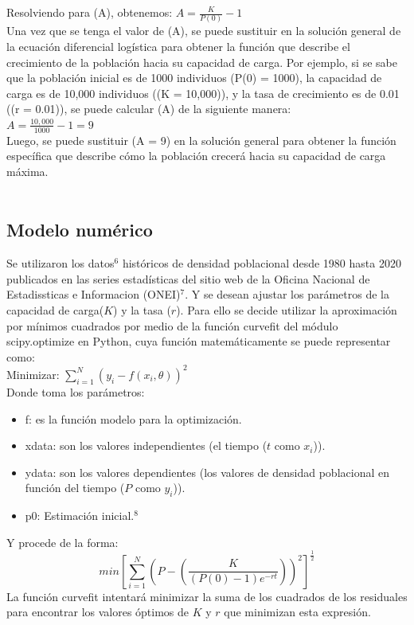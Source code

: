 \documentclass[a4paper,10pt,twocolumn]{article}
\begin{document}
Resolviendo para (A), obtenemos: $A = \frac{K}{P(0)} - 1$\\
Una vez que se tenga el valor de (A), se puede sustituir en la solución general de la ecuación diferencial 
logística para obtener la función que describe el crecimiento de la población hacia su capacidad de carga.
Por ejemplo, si se sabe que la población inicial es de 1000 individuos (P(0) = 1000), la capacidad de carga 
es de 10,000 individuos ((K = 10,000)), y la tasa de crecimiento es de 0.01 ((r = 0.01)), 
se puede calcular (A) de la siguiente manera:\\
$A = \frac{10,000}{1000} - 1 = 9$\\
Luego, se puede sustituir (A = 9) en la solución general para obtener la función específica que describe cómo la 
población crecerá hacia su capacidad de carga máxima.\\\\

	\subsection{Modelo numérico}\label{sub:num}
Se utilizaron los datos$^{6}$ históricos de densidad poblacional desde 1980 hasta 2020 publicados en las series estadísticas del sitio web de la Oficina Nacional de Estadissticas e Informacion (ONEI)$^{7}$. Y se desean ajustar los parámetros de la capacidad de carga($K$) y la tasa ($r$).
Para ello se decide utilizar la aproximación por mínimos cuadrados por medio de la función curvefit del módulo scipy.optimize en Python, cuya función matemáticamente se puede representar como:\\
Minimizar: $\sum_{i=1}^{N} (y_{i} - f(x_{i}, \theta))^2 $ \\
Donde toma los parámetros:
\begin{itemize}
	\item f: es la función modelo para la optimización.
	\item xdata: son los valores independientes (el tiempo ($t$ como $x_{i}$)).
	\item ydata: son los valores dependientes (los valores de densidad poblacional en función del tiempo ($P$ como $y_{i}$)).
	\item p0: Estimación inicial.$^{8}$
\end{itemize}
Y procede de la forma:\\ $$min[\sum_{i=1}^{N} (P - (\frac{K}{(P(0)-1)e^{-rt}}))^{2}]^{\frac{1}{2}}$$
La función curvefit intentará minimizar la suma de los cuadrados de los residuales para encontrar los valores óptimos de $K$ y $r$ que minimizan esta expresión. 
\end{document}
